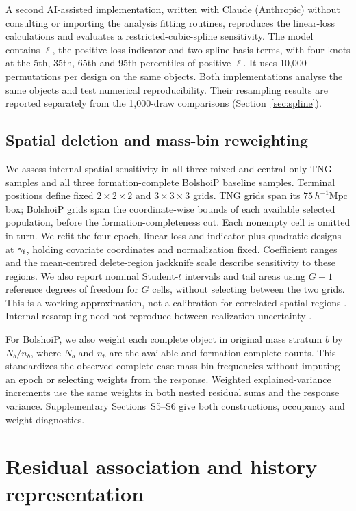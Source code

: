 \documentclass[11pt,a4paper]{article}
\begin{document}
A second AI-assisted implementation, written with Claude (Anthropic) without consulting or importing the analysis fitting routines, reproduces the linear-loss calculations and evaluates a restricted-cubic-spline sensitivity. The model contains $\ell$, the positive-loss indicator and two spline basis terms, with four knots at the 5th, 35th, 65th and 95th percentiles of positive $\ell$. It uses 10,000 permutations per design on the same objects. Both implementations analyse the same objects and test numerical reproducibility. Their resampling results are reported separately from the 1,000-draw comparisons (Section~\ref{sec:spline}).

\subsection{Spatial deletion and mass-bin reweighting}\label{sec:spatial_methods}
We assess internal spatial sensitivity in all three mixed and central-only TNG samples and all three formation-complete BolshoiP baseline samples. Terminal positions define fixed $2\times2\times2$ and $3\times3\times3$ grids. TNG grids span its $75\,h^{-1}\mathrm{Mpc}$ box; BolshoiP grids span the coordinate-wise bounds of each available selected population, before the formation-completeness cut. Each nonempty cell is omitted in turn. We refit the four-epoch, linear-loss and indicator-plus-quadratic designs at $\gamma_{\rm f}$, holding covariate coordinates and normalization fixed. Coefficient ranges and the mean-centred delete-region jackknife scale describe sensitivity to these regions. We also report nominal Student-$t$ intervals and tail areas using $G-1$ reference degrees of freedom for $G$ cells, without selecting between the two grids. This is a working approximation, not a calibration for correlated spatial regions \citep{CameronMiller2015,MacKinnon2023}. Internal resampling need not reproduce between-realization uncertainty \citep{Norberg2009}.

For BolshoiP, we also weight each complete object in original mass stratum $b$ by $N_b/n_b$, where $N_b$ and $n_b$ are the available and formation-complete counts. This standardizes the observed complete-case mass-bin frequencies without imputing an epoch or selecting weights from the response. Weighted explained-variance increments use the same weights in both nested residual sums and the response variance. Supplementary Sections~S5--S6 give both constructions, occupancy and weight diagnostics.

\section{Residual association and history representation}
\end{document}
